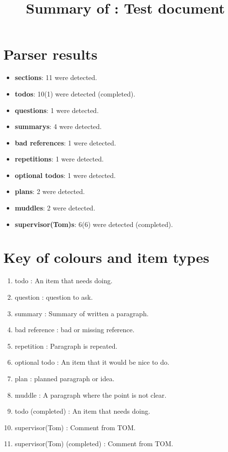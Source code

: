 \title{Summary of : Test document}
\maketitle

\section{Parser results}
    \begin{itemize}[noitemsep]
\item \textbf{sections}: 11 were detected.
\item \textbf{todos}: 10(1) were detected (completed).
\item \textbf{questions}: 1 were detected.
\item \textbf{summarys}: 4 were detected.
\item \textbf{bad references}: 1 were detected.
\item \textbf{repetitions}: 1 were detected.
\item \textbf{optional todos}: 1 were detected.
\item \textbf{plans}: 2 were detected.
\item \textbf{muddles}: 2 were detected.
\item \textbf{supervisor(Tom)s}: 6(6) were detected (completed).
    \end{itemize}

\section{Key of colours and item types}
    \begin{enumerate}[noitemsep]
        \item {\color{red}todo : An item that needs doing.}
        \item {\color{ForestGreen}question : question to ask.}
        \item summary : Summary of written a paragraph.
        \item {\color{Periwinkle}bad reference : bad or missing reference.}
        \item {\color{DarkOrchid}repetition : Paragraph is repeated.}
        \item {\color{Orange}optional todo : An item that it would be nice to do.}
        \item {\color{blue}plan : planned paragraph or idea.}
        \item {\color{OliveGreen}muddle : A paragraph where the point is not clear.}
        \item {\color{Gray}todo (completed) : An item that needs doing.}
        \item {\color{WildStrawberry}supervisor(Tom) : Comment from TOM.}
        \item {\color{Gray}supervisor(Tom) (completed) : Comment from TOM.}
    \end{enumerate}

